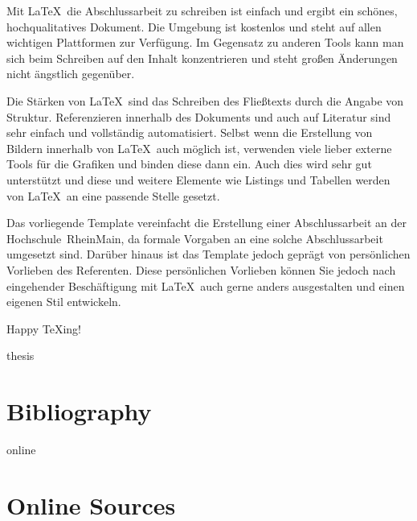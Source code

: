 \documentclass[11pt,a4paper]{report}
\begin{document}
Mit \LaTeX\ die Abschlussarbeit zu schreiben ist 
einfach und ergibt ein schönes, hochqualitatives Dokument.
Die Umgebung ist kostenlos und steht auf allen wichtigen
Plattformen zur Verfügung.
Im Gegensatz zu anderen Tools kann man sich beim Schreiben 
auf den Inhalt konzentrieren und steht großen Änderungen 
nicht ängstlich gegenüber.

Die Stärken von \LaTeX\ sind das Schreiben des Fließtexts
durch die Angabe von Struktur. 
Referenzieren innerhalb des Dokuments und auch auf 
Literatur sind sehr einfach und vollständig automatisiert. 
Selbst wenn die Erstellung von Bildern innerhalb von
\LaTeX\ auch möglich ist, verwenden viele lieber externe 
Tools für die Grafiken und binden diese dann ein. 
Auch dies wird sehr gut unterstützt und diese und
weitere Elemente wie Listings und Tabellen werden
von \LaTeX\ an eine passende Stelle gesetzt.

Das vorliegende Template vereinfacht die Erstellung
einer Abschlussarbeit an der Hochschule~RheinMain,
da formale Vorgaben an eine solche Abschlussarbeit
umgesetzt sind. 
Darüber hinaus ist das Template jedoch geprägt von 
persönlichen Vorlieben des Referenten. 
Diese persönlichen Vorlieben können Sie jedoch 
nach eingehender Beschäftigung mit \LaTeX\ auch gerne 
anders ausgestalten und einen eigenen Stil entwickeln.

Happy \TeX ing! 

\newpage


\begin{btSect}{thesis} %
\section*{Bibliography}
\btPrintCited
\end{btSect}
\begin{btSect}{online}
\section*{Online Sources}
\btPrintCited
\end{btSect}
\end{document}
